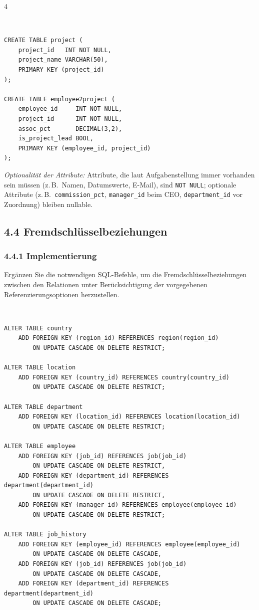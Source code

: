 \documentclass[8pt,a4paper]{extarticle}
\newenvironment{loesung}[1][]{%
    \par\noindent{\bfseries\color{loesungrahmen}\small$\blacktriangleright$~L\"osung#1:}~%
}{\par\smallskip}
\begin{document}
\begin{multicols}{4}
\begin{loesung}
\begin{lstlisting}
CREATE TABLE project (
    project_id   INT NOT NULL,
    project_name VARCHAR(50),
    PRIMARY KEY (project_id)
);

CREATE TABLE employee2project (
    employee_id     INT NOT NULL,
    project_id      INT NOT NULL,
    assoc_pct       DECIMAL(3,2),
    is_project_lead BOOL,
    PRIMARY KEY (employee_id, project_id)
);
\end{lstlisting}
\emph{Optionalit\"at der Attribute:} Attribute, die laut Aufgabenstellung immer vorhanden sein m\"ussen (z.\,B.\ Namen, Datumswerte, E-Mail), sind \texttt{NOT NULL}; optionale Attribute (z.\,B.\ \texttt{commission\_pct}, \texttt{manager\_id} beim CEO, \texttt{department\_id} vor Zuordnung) bleiben nullable.
\end{loesung}

\subsection*{4.4 \quad Fremdschl\"usselbeziehungen}
\subsubsection*{4.4.1 \quad Implementierung}
Erg\"anzen Sie die notwendigen SQL-Befehle, um die Fremdschl\"usselbeziehungen zwischen den Relationen unter Ber\"ucksichtigung der vorgegebenen Referenzierungsoptionen herzustellen.

\begin{loesung}
\begin{lstlisting}
ALTER TABLE country
    ADD FOREIGN KEY (region_id) REFERENCES region(region_id)
        ON UPDATE CASCADE ON DELETE RESTRICT;

ALTER TABLE location
    ADD FOREIGN KEY (country_id) REFERENCES country(country_id)
        ON UPDATE CASCADE ON DELETE RESTRICT;

ALTER TABLE department
    ADD FOREIGN KEY (location_id) REFERENCES location(location_id)
        ON UPDATE CASCADE ON DELETE RESTRICT;

ALTER TABLE employee
    ADD FOREIGN KEY (job_id) REFERENCES job(job_id)
        ON UPDATE CASCADE ON DELETE RESTRICT,
    ADD FOREIGN KEY (department_id) REFERENCES department(department_id)
        ON UPDATE CASCADE ON DELETE RESTRICT,
    ADD FOREIGN KEY (manager_id) REFERENCES employee(employee_id)
        ON UPDATE CASCADE ON DELETE RESTRICT;

ALTER TABLE job_history
    ADD FOREIGN KEY (employee_id) REFERENCES employee(employee_id)
        ON UPDATE CASCADE ON DELETE CASCADE,
    ADD FOREIGN KEY (job_id) REFERENCES job(job_id)
        ON UPDATE CASCADE ON DELETE CASCADE,
    ADD FOREIGN KEY (department_id) REFERENCES department(department_id)
        ON UPDATE CASCADE ON DELETE CASCADE;


\end{lstlisting}
\end{loesung}
\end{multicols}
\end{document}
